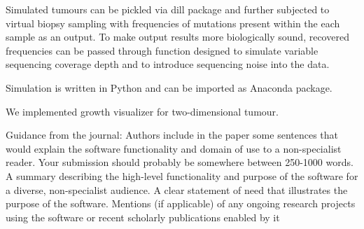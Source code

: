\documentclass[11pt,a4paper]{article}
\begin{document}
Simulated tumours can be pickled via dill package \cite{mckerns:arXiv:2012} and further subjected to virtual biopsy sampling with frequencies of mutations present within the each sample as an output. 
To make output results more biologically sound, recovered frequencies can be passed through function designed to simulate variable sequencing coverage depth and to introduce sequencing noise into the data. 




Simulation is written in Python and can be imported as Anaconda package. 

We implemented growth visualizer for two-dimensional tumour.







Guidance from the journal:
Authors include in the paper some sentences that would explain the software functionality and domain of use to a non-specialist reader. Your submission should probably be somewhere between 250-1000 words. A summary describing the high-level functionality and purpose of the software for a diverse, non-specialist audience.
A clear statement of need that illustrates the purpose of the software. Mentions (if applicable) of any ongoing research projects using the software or recent scholarly publications enabled by it



%
%

\end{document}
